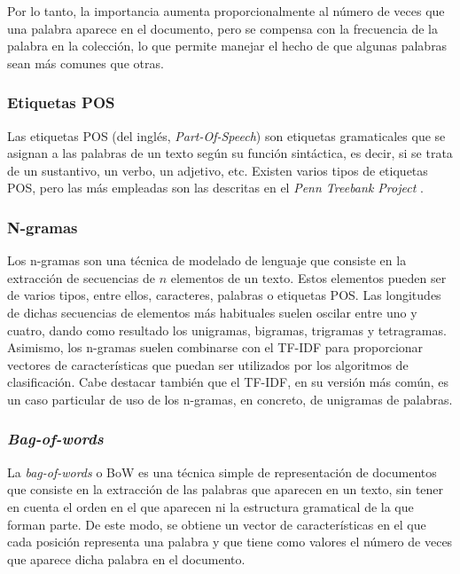 \bigskip
Por lo tanto, la importancia aumenta proporcionalmente al número de veces que una palabra aparece en el documento, pero se compensa con la frecuencia
de la palabra en la colección, lo que permite manejar el hecho de que algunas palabras sean más comunes que otras.

\subsubsection{Etiquetas POS}

Las etiquetas POS (del inglés, \textit{Part-Of-Speech}) son etiquetas gramaticales que se asignan a las palabras de un texto según su función sintáctica, es
decir, si se trata de un sustantivo, un verbo, un adjetivo, etc.
Existen varios tipos de etiquetas POS, pero las más empleadas son las descritas en el \textit{Penn Treebank Project} \cite{marcus1993building}.

\subsubsection{N-gramas}

Los n-gramas son una técnica de modelado de lenguaje que consiste en la extracción de secuencias de $n$ elementos de un texto. Estos elementos pueden ser de varios
tipos, entre ellos, caracteres, palabras o etiquetas POS. Las longitudes de dichas secuencias de elementos más habituales suelen oscilar entre uno y cuatro, dando como resultado los unigramas, bigramas,
trigramas y tetragramas.
Asimismo, los n-gramas suelen combinarse con el TF-IDF para proporcionar vectores de características que puedan ser utilizados por los algoritmos de clasificación.
Cabe destacar también que el TF-IDF, en su versión más común, es un caso particular de uso de los n-gramas, en concreto, de unigramas de palabras.

\subsubsection{\textit{Bag-of-words}}
\label{sec:bag_of_words}

La \textit{bag-of-words} o BoW es una técnica simple de representación de documentos que consiste en la extracción de las palabras que aparecen en un texto,
sin tener en cuenta el orden en el que aparecen ni la estructura gramatical de la que forman parte. De este modo, se obtiene un vector de características en el
que cada posición representa una palabra y que tiene como valores el número de veces que aparece dicha palabra en el documento.

